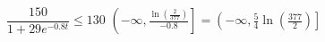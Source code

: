 {$\dfrac{150}{1 + 29e^{-0.8t}} \leq 130$}
{$\left(-\infty, \frac{\ln\left(\frac{2}{377}\right)}{-0.8} \right] = \left(-\infty, \frac{5}{4}\ln\left(\frac{377}{2}\right) \right]$}
